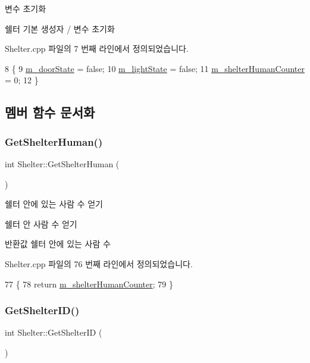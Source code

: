 변수 초기화 

쉘터 기본 생성자 / 변수 초기화 

Shelter.\+cpp 파일의 7 번째 라인에서 정의되었습니다.


\begin{DoxyCode}
8 \{
9     \hyperlink{class_shelter_a8deab51bd304b5cb728c2e739f5afa15}{m\_doorState} = \textcolor{keyword}{false};
10     \hyperlink{class_shelter_ad18359b14559c0f0e77fdb416b39529f}{m\_lightState} = \textcolor{keyword}{false};
11     \hyperlink{class_shelter_a31a7132fc38ce768924bb59302d02d82}{m\_shelterHumanCounter} = 0;
12 \}
\end{DoxyCode}


\subsection{멤버 함수 문서화}
\mbox{\label{class_shelter_ad25c083e736fa8850a199d78c4ca753e}} 
\subsubsection{\texorpdfstring{Get\+Shelter\+Human()}{GetShelterHuman()}}
{\footnotesize\ttfamily int Shelter\+::\+Get\+Shelter\+Human (\begin{DoxyParamCaption}{ }\end{DoxyParamCaption})}



쉘터 안에 있는 사람 수 얻기 

쉘터 안 사람 수 얻기

\begin{DoxyReturn}{반환값}
쉘터 안에 있는 사람 수 
\end{DoxyReturn}


Shelter.\+cpp 파일의 76 번째 라인에서 정의되었습니다.


\begin{DoxyCode}
77 \{
78     \textcolor{keywordflow}{return} \hyperlink{class_shelter_a31a7132fc38ce768924bb59302d02d82}{m\_shelterHumanCounter};
79 \}
\end{DoxyCode}
\mbox{\label{class_shelter_a3c7126b39e09028cccc6af1b058d0108}} 
\subsubsection{\texorpdfstring{Get\+Shelter\+I\+D()}{GetShelterID()}}
{\footnotesize\ttfamily int Shelter\+::\+Get\+Shelter\+ID (\begin{DoxyParamCaption}{ }\end{DoxyParamCaption})}



